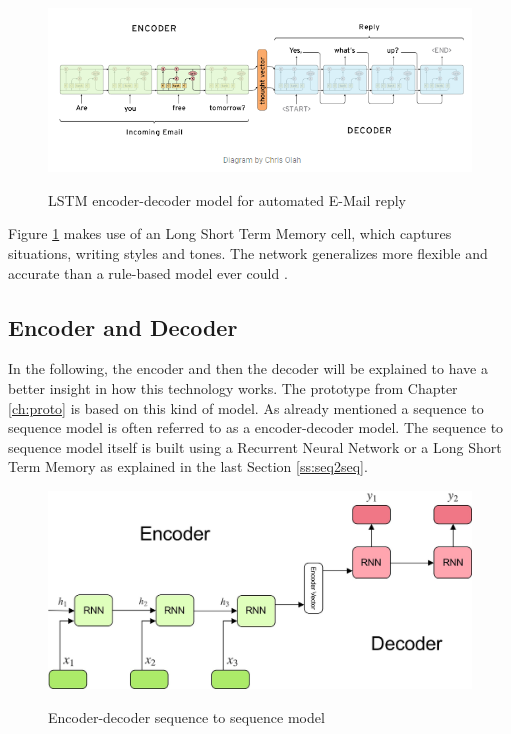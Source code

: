 \begin{figure}
	\begin{center}
		\includegraphics[width=5.5in]{photos/encoder_decoder}\\
		\caption{LSTM encoder-decoder model for automated E-Mail reply}\label{enc-dec}
	\end{center}
\end{figure}

Figure \ref{enc-dec} makes use of an Long Short Term Memory cell, which captures situations, writing styles and tones. The network generalizes more flexible and accurate than a rule-based model ever could \cite{google}. 


\subsection{Encoder and Decoder}

In the following, the encoder and then the decoder will be explained to have a better insight in how this technology works. The prototype from Chapter \ref{ch:proto} is based on this kind of model. As already mentioned a sequence to sequence model is often referred to as a encoder-decoder model. The sequence to sequence model itself is built using a Recurrent Neural Network or a Long Short Term Memory as explained in the last Section \ref{ss:seq2seq}.

\begin{figure}
	\begin{center}
		\includegraphics[width=4.5in]{photos/encoderdecoder.jpeg}\\
		\caption{Encoder-decoder sequence to sequence model \cite{encdec}}\label{encdecseq}
	\end{center}
\end{figure}

